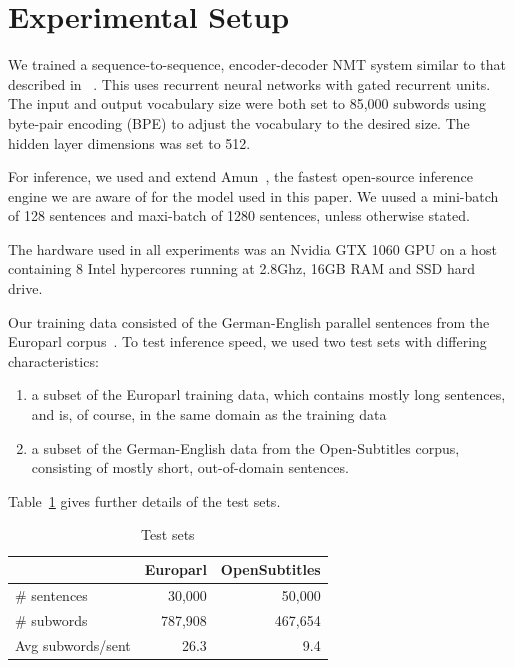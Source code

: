 \documentclass[11pt,a4paper]{article}
\begin{document}
\section{Experimental Setup}
\label{sec:Experimental Setup}

We trained a sequence-to-sequence, encoder-decoder NMT system similar to that described in ~\cite{sennrich-haddow-birch:2016:P16-12}. This uses recurrent neural networks with gated recurrent units. The input and output vocabulary size were both set to 85,000 subwords using byte-pair encoding (BPE) to adjust the vocabulary to the desired size. The hidden layer dimensions was set to 512. %

For inference, we used and extend Amun~\citep{junczys2016neural}, the fastest open-source inference engine we are aware of for the model used in this paper. We uused a mini-batch of 128 sentences and maxi-batch of 1280 sentences, unless otherwise stated.

The hardware used in all experiments was an Nvidia GTX 1060 GPU on a host containing 8 Intel hypercores running at 2.8Ghz, 16GB RAM and SSD hard drive.

Our training data consisted of the German-English parallel sentences from the Europarl corpus~\citep{Koehn:2005:MTS}. To test inference speed, we used two test sets with differing characteristics:
\begin{enumerate}
   \item \vspace{-2 mm} a subset of the Europarl training data, which contains mostly long sentences, and is, of course, in the same domain as the training data
   \item \vspace{-2 mm} a subset of the German-English data from the Open-Subtitles corpus, consisting of mostly short, out-of-domain sentences.
\end{enumerate}
Table~\ref{tab:corpora} gives further details of the test sets.

\begin{table}
\begin{center}
\small
\begin{tabular}{|l|r|r|} \hline
		  & Europarl		& OpenSubtitles \\ \hline
\# sentences  	  & 30,000 		& 50,000 \\
\# subwords 	  & 787,908 		& 467,654 \\ 
Avg subwords/sent & 26.3		& 9.4 \\ \hline
\end{tabular}
\end{center}
\caption{Test sets}
\label{tab:corpora}
\end{table}
\end{document}
